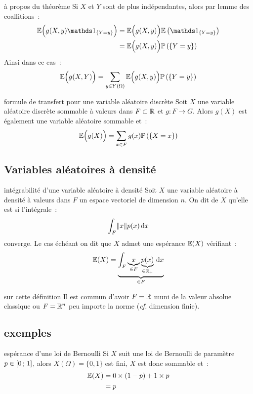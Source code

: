 \begin{remarque}{}{à propos du théorème}
    Si $X$ et $Y$ sont de plus indépendantes, alors par lemme des coallitions~:
    \begin{align*}
        \esperanceBig{g(X,y)\indicatrice_{\{Y=y\}}} &= \esperanceBig{g(X,y)} \esperance{\indicatrice_{\{Y=y\}}}\\
        &= \esperanceBig{g(X,y)} \probaset{Y=y}
    \end{align*}
    Ainsi dans ce cas~:
    $$\mathbb{E}\Big(g(X,Y)\Big) = \sum_{y \in Y(\Omega)} \mathbb{E}\Big(g(X,y)\Big)\mathbb{P}\left(\left\{Y=y\right\}\right)$$

\end{remarque}

\begin{theoreme}{}{formule de transfert pour une variable aléatoire discrète}
    Soit $X$ une variable aléatoire discrète sommable à valeurs dans $F \subset \mathbb{R}$ et $g : F \to G$. Alors $g(X)$ est également une variable aléatoire sommable et~:
    $$\mathbb{E}\Big(g(X)\Big) = \sum_{x \in F}g(x)\mathbb{P}\left(\left\{X = x\right\}\right)$$
\end{theoreme}

\subsection{Variables aléatoires     à densité}

\begin{definition}{}{intégrabilité d'une variable aléatoire à densité}
    Soit $X$ une variable aléatoire à densité à valeurs dans $F$ un espace vectoriel de dimension $n$. On dit de $X$ qu'elle est  si l'intégrale~:
    $$\int_F \lVert x\rVert p(x) \,\mathrm{d}x$$
    converge. Le cas échéant on dit que $X$ admet une espérance $\mathbb{E}(X)$ vérifiant~:
    $$\mathbb{E}(X) = \underbrace{\int_F \underbrace{x}_{\in F} \underbrace{p(x)}_{\in \mathbb{R}_+}\,\mathrm{d}x}_{\in F}$$
\end{definition}

\begin{remarque}{}{sur cette définition}
    Il est commun d'avoir $F = \mathbb{R}$ muni de la valeur absolue classique ou $F = \mathbb{R}^n$ peu importe la norme (\textit{cf.} dimension finie).
\end{remarque}

\subsection{exemples}


\begin{exemple}{}{espérance d'une loi de Bernoulli}
    Si $X$ suit une loi de Bernoulli de paramètre $p \in [0\, ; \, 1]$, alors $X(\Omega) = \{0, 1\}$ est fini, $X$ est donc sommable et~:
    \begin{align*}
        \mathbb{E}(X) &= 0 \times (1-p) + 1 \times p \\
        &= p
    \end{align*}
\end{exemple}

